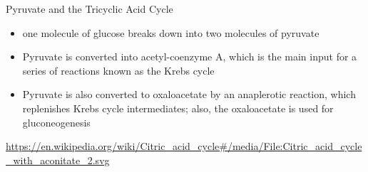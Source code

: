 \documentclass[presentation, smaller]{beamer}
\begin{document}
\begin{frame}[label={sec:org64a9d32}]{Pyruvate and the Tricyclic Acid Cycle}
\begin{itemize}
\item one molecule of glucose breaks down into two molecules of pyruvate
\item Pyruvate is converted into acetyl-coenzyme A, which is the main
input for a series of reactions known as the Krebs cycle
\item Pyruvate is also converted to oxaloacetate by an anaplerotic
reaction, which replenishes Krebs cycle intermediates; also, the
oxaloacetate is used for gluconeogenesis
\end{itemize}

\url{https://en.wikipedia.org/wiki/Citric\_acid\_cycle\#/media/File:Citric\_acid\_cycle\_with\_aconitate\_2.svg}
\end{frame}
\end{document}
